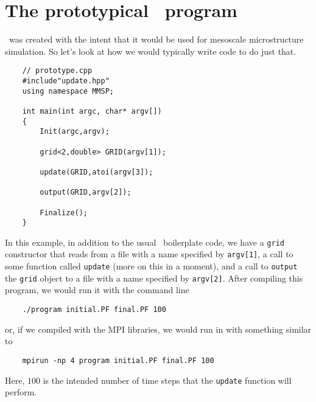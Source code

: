 \section{The prototypical \MMSP\ program}
\MMSP\ was created with the intent that it would be used for mesoscale microstructure simulation.  So let's look at how we would typically write code to do just that.
\begin{shadebox}
\begin{verbatim}
    // prototype.cpp
    #include"update.hpp"
    using namespace MMSP;

    int main(int argc, char* argv[])
    {
        Init(argc,argv);

        grid<2,double> GRID(argv[1]);

        update(GRID,atoi(argv[3]);

        output(GRID,argv[2]);

        Finalize();
    }
\end{verbatim}
\end{shadebox}
In this example, in addition to the usual \MMSP\ boilerplate code, we have a {\tt grid} constructor that reads from a file with a name specified by {\tt argv[1]}, a call to some function called {\tt update} (more on this in a moment), and a call to {\tt output} the {\tt grid} object to a file with a name specified by {\tt argv[2]}. After compiling this program, we would run it with the command line
\begin{shadebox}
\begin{verbatim}
    ./program initial.PF final.PF 100
\end{verbatim}
\end{shadebox}
or, if we compiled with the MPI libraries, we would run in with something similar to
\begin{shadebox}
\begin{verbatim}
    mpirun -np 4 program initial.PF final.PF 100
\end{verbatim}
\end{shadebox}
Here, $100$ is the intended number of time steps that the {\tt update} function will perform.

